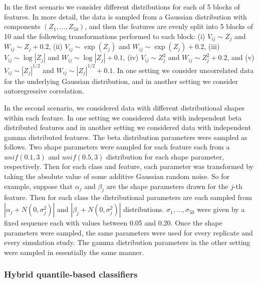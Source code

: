 In the first scenario we consider different distributions for each of 5 blocks
of features.  In more detail, the data is sampled from a Gaussian distribution
with components $(Z_1, \dots, Z_{50})$, and then the features are evenly split
into 5 blocks of 10 and the following transformations performed to each block:
(i) $V_{ij} \sim Z_j$ and $W_{ij} \sim Z_j + 0.2$, (ii) $V_{ij} \sim \exp(Z_j)$
and $W_{ij} \sim \exp(Z_j) + 0.2$, (iii) $V_{ij} \sim \log |Z_j|$ and
$W_{ij} \sim \log |Z_j| + 0.1$, (iv) $V_{ij} \sim Z_j^2$ and
$W_{ij} \sim Z_j^2 + 0.2$, and (v) $V_{ij} \sim |Z_j|^{1/2}$ and
$W_{ij} \sim |Z_j|^{1/2} + 0.1$.  In one setting we consider uncorrelated data
for the underlying Gaussian distribution, and in another setting we consider
autoregressive correlation.

In the second scenario, we considered data with different distributional shapes
within each feature.  In one setting we considered data with independent beta
distributed features and in another setting we considered data with independent
gamma distributed features.  The beta distribution parameters were sampled as
follows.  Two shape parameters were sampled for each feature each from a
$\mathit{unif}(0.1, 3)$ and $\mathit{unif}(0.5, 3)$ distribution for each shape
parameter, respectively.  Then for each class and feature, each parameter was
transformed by taking the absolute value of some additive Gaussian random noise.
So for example, suppose that $\alpha_j$ and $\beta_j$ are the shape parameters
drawn for the $j$-th feature.  Then for each class the distributional parameters
are each sampled from $|\alpha_j + N(0, \sigma_j^2)|$ and
$|\beta_j + N(0, \sigma_j^2)|$ distributions.  $\sigma_1, \dots, \sigma_{50}$
were given by a fixed sequence each with values between 0.05 and 0.20.  Once the
shape parameters were sampled, the same parameters were used for every replicate
and every simulation study.  The gamma distribution parameters in the other
setting were sampled in essentially the same manner.


\subsubsection{Hybrid quantile-based classifiers}
\label{sec:hybid-cqc}

